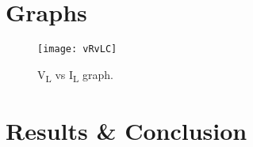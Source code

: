 \documentclass[a4paper]{article}
\begin{document}
%
%
%
%
%

\section{Graphs}
\begin{figure}[H]
\centering
{\texttt{[image: vRvLC]}}
\caption{\label{fig:Oscilloscope display (with filter).}V\textsubscript{\tiny L} vs I\textsubscript{\tiny L} graph.}
\end{figure}

\section{Results \& Conclusion}
\end{document}
